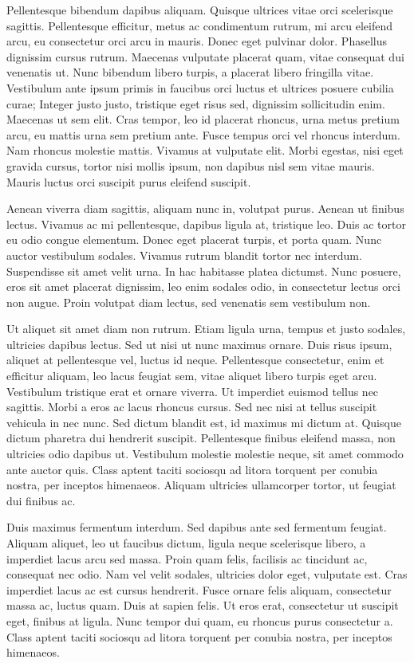 Pellentesque bibendum dapibus aliquam. Quisque ultrices vitae orci scelerisque sagittis. Pellentesque efficitur, metus ac condimentum rutrum, mi arcu eleifend arcu, eu consectetur orci arcu in mauris. Donec eget pulvinar dolor. Phasellus dignissim cursus rutrum. Maecenas vulputate placerat quam, vitae consequat dui venenatis ut. Nunc bibendum libero turpis, a placerat libero fringilla vitae. Vestibulum ante ipsum primis in faucibus orci luctus et ultrices posuere cubilia curae; Integer justo justo, tristique eget risus sed, dignissim sollicitudin enim. Maecenas ut sem elit. Cras tempor, leo id placerat rhoncus, urna metus pretium arcu, eu mattis urna sem pretium ante. Fusce tempus orci vel rhoncus interdum. Nam rhoncus molestie mattis. Vivamus at vulputate elit. Morbi egestas, nisi eget gravida cursus, tortor nisi mollis ipsum, non dapibus nisl sem vitae mauris. Mauris luctus orci suscipit purus eleifend suscipit.

Aenean viverra diam sagittis, aliquam nunc in, volutpat purus. Aenean ut finibus lectus. Vivamus ac mi pellentesque, dapibus ligula at, tristique leo. Duis ac tortor eu odio congue elementum. Donec eget placerat turpis, et porta quam. Nunc auctor vestibulum sodales. Vivamus rutrum blandit tortor nec interdum. Suspendisse sit amet velit urna. In hac habitasse platea dictumst. Nunc posuere, eros sit amet placerat dignissim, leo enim sodales odio, in consectetur lectus orci non augue. Proin volutpat diam lectus, sed venenatis sem vestibulum non.

Ut aliquet sit amet diam non rutrum. Etiam ligula urna, tempus et justo sodales, ultricies dapibus lectus. Sed ut nisi ut nunc maximus ornare. Duis risus ipsum, aliquet at pellentesque vel, luctus id neque. Pellentesque consectetur, enim et efficitur aliquam, leo lacus feugiat sem, vitae aliquet libero turpis eget arcu. Vestibulum tristique erat et ornare viverra. Ut imperdiet euismod tellus nec sagittis. Morbi a eros ac lacus rhoncus cursus. Sed nec nisi at tellus suscipit vehicula in nec nunc. Sed dictum blandit est, id maximus mi dictum at. Quisque dictum pharetra dui hendrerit suscipit. Pellentesque finibus eleifend massa, non ultricies odio dapibus ut. Vestibulum molestie molestie neque, sit amet commodo ante auctor quis. Class aptent taciti sociosqu ad litora torquent per conubia nostra, per inceptos himenaeos. Aliquam ultricies ullamcorper tortor, ut feugiat dui finibus ac.

Duis maximus fermentum interdum. Sed dapibus ante sed fermentum feugiat. Aliquam aliquet, leo ut faucibus dictum, ligula neque scelerisque libero, a imperdiet lacus arcu sed massa. Proin quam felis, facilisis ac tincidunt ac, consequat nec odio. Nam vel velit sodales, ultricies dolor eget, vulputate est. Cras imperdiet lacus ac est cursus hendrerit. Fusce ornare felis aliquam, consectetur massa ac, luctus quam. Duis at sapien felis. Ut eros erat, consectetur ut suscipit eget, finibus at ligula. Nunc tempor dui quam, eu rhoncus purus consectetur a. Class aptent taciti sociosqu ad litora torquent per conubia nostra, per inceptos himenaeos.

